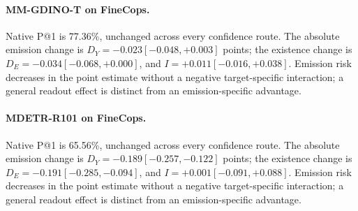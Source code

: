 \paragraph{MM-GDINO-T on FineCops.} Native P@1 is 77.36\%, unchanged across every confidence route. The absolute emission change is $D_Y=-0.023 [-0.048, +0.003]$ points; the existence change is $D_E=-0.034 [-0.068, +0.000]$, and $I=+0.011 [-0.016, +0.038]$. Emission risk decreases in the point estimate without a negative target-specific interaction; a general readout effect is distinct from an emission-specific advantage.

\paragraph{MDETR-R101 on FineCops.} Native P@1 is 65.56\%, unchanged across every confidence route. The absolute emission change is $D_Y=-0.189 [-0.257, -0.122]$ points; the existence change is $D_E=-0.191 [-0.285, -0.094]$, and $I=+0.001 [-0.091, +0.088]$. Emission risk decreases in the point estimate without a negative target-specific interaction; a general readout effect is distinct from an emission-specific advantage.
